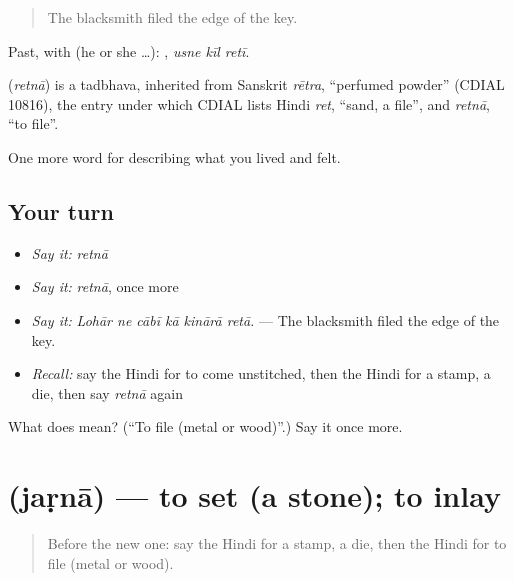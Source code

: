 \begin{quote}
The blacksmith filed the edge of the key.
\end{quote}

Past, with  (he or she …):   , \emph{usne kīl retī}.

\begin{cousinweb}
\textbf{} (\emph{retnā}) is a tadbhava, inherited from Sanskrit \emph{rētra}, \textquotedblleft{}perfumed powder\textquotedblright{} (CDIAL 10816), the entry under which CDIAL lists Hindi \emph{ret}, \textquotedblleft{}sand, a file\textquotedblright{}, and \emph{retnā}, \textquotedblleft{}to file\textquotedblright{}.
\end{cousinweb}

\begin{grammarlens}[title={What you've built}]
One more word for describing what you lived and felt.
\end{grammarlens}

\subsection*{Your turn}
\begin{itemize}
\raggedright
  \item \emph{Say it:} \emph{retnā}
  \item \emph{Say it:} \emph{retnā}, once more
  \item \emph{Say it:} \emph{Lohār ne cābī kā kinārā retā.} — The blacksmith filed the edge of the key.
  \item \emph{Recall:} say the Hindi for to come unstitched, then the Hindi for a stamp, a die, then say \emph{retnā} again
\end{itemize}

\begin{tcolorbox}[breakable,colback=teal!4,colframe=teal!35!black,title={Before you move on}]
What does  mean? (\textquotedblleft{}To file (metal or wood)\textquotedblright{}.) Say it once more.
\end{tcolorbox}
\section[\texorpdfstring{\hi{जड़ना} (jaṛnā)}{जड़ना (jaṛnā)}]{ (jaṛnā) — to set (a stone); to inlay}

\label{lesson:HI-C514-jarna}



\begin{quote}
Before the new one: say the Hindi for a stamp, a die, then the Hindi for to file (metal or wood).
\end{quote}

